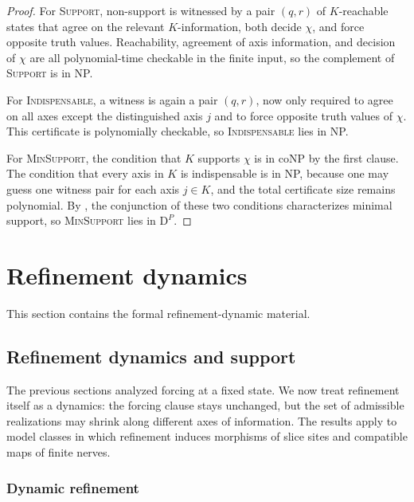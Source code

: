 \begin{proof}
For \textup{\textsc{Support}}, non-support is witnessed by a pair $(q,r)$ of $K$-reachable states that agree on the relevant $K$-information, both decide $\chi$, and force opposite truth values. Reachability, agreement of axis information, and decision of $\chi$ are all polynomial-time checkable in the finite input, so the complement of \textup{\textsc{Support}} is in NP.

For \textup{\textsc{Indispensable}}, a witness is again a pair $(q,r)$, now only required to agree on all axes except the distinguished axis $j$ and to force opposite truth values of $\chi$. This certificate is polynomially checkable, so \textup{\textsc{Indispensable}} lies in NP.

For \textup{\textsc{MinSupport}}, the condition that $K$ supports $\chi$ is in coNP by the first clause. The condition that every axis in $K$ is indispensable is in NP, because one may guess one witness pair for each axis $j\in K$, and the total certificate size remains polynomial. By , the conjunction of these two conditions characterizes minimal support, so \textup{\textsc{MinSupport}} lies in $\mathrm{D}^P$.
\end{proof}

\section{Refinement dynamics}\label{sec:appendix-dynamics}

This section contains the formal refinement-dynamic material.

\subsection{Refinement dynamics and support}\label{sec:appendix-multiaxis-refinement}

The previous sections analyzed forcing at a fixed state. We now treat refinement itself as a dynamics: the forcing clause stays unchanged, but the set of admissible realizations may shrink along different axes of information. The results apply to model classes in which refinement induces morphisms of slice sites and compatible maps of finite nerves.

\subsubsection{Dynamic refinement}

